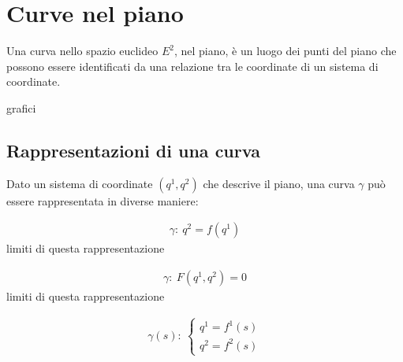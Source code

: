 \documentclass[letterpaper,10pt,english]{jupyterBook}
\begin{document}
\sphinxstepscope


\section{Curve nel piano}
\label{\detokenize{ch/analytic_geometry/analytic_geometry_2d/curves:curve-nel-piano}}\label{\detokenize{ch/analytic_geometry/analytic_geometry_2d/curves:geometry-analytic-2d-curves}}\label{\detokenize{ch/analytic_geometry/analytic_geometry_2d/curves::doc}}
\sphinxAtStartPar
Una curva nello spazio euclideo \(E^2\), nel piano, è un luogo dei punti del piano che possono essere identificati da una relazione tra le coordinate di un sistema di coordinate.

\sphinxAtStartPar
{}  grafici




\subsection{Rappresentazioni di una curva}
\label{\detokenize{ch/analytic_geometry/analytic_geometry_2d/curves:rappresentazioni-di-una-curva}}
\sphinxAtStartPar
Dato un sistema di coordinate \((q^1, q^2)\) che descrive il piano, una curva \(\gamma\) può essere rappresentata in diverse maniere:

\sphinxAtStartPar
{}
\begin{equation*}
\begin{split}\gamma: \ q^2 = f(q^1)\end{split}
\end{equation*}
\sphinxAtStartPar
{} limiti di questa rappresentazione

\sphinxAtStartPar
{}
\begin{equation*}
\begin{split}\gamma: \ F(q^1, q^2) = 0\end{split}
\end{equation*}
\sphinxAtStartPar
{} limiti di questa rappresentazione

\sphinxAtStartPar
{}
\begin{equation*}
\begin{split}\gamma(s): \ \begin{cases} q^1 = f^1(s) \\ q^2 = f^2(s) \end{cases}\end{split}
\end{equation*}
\end{document}

